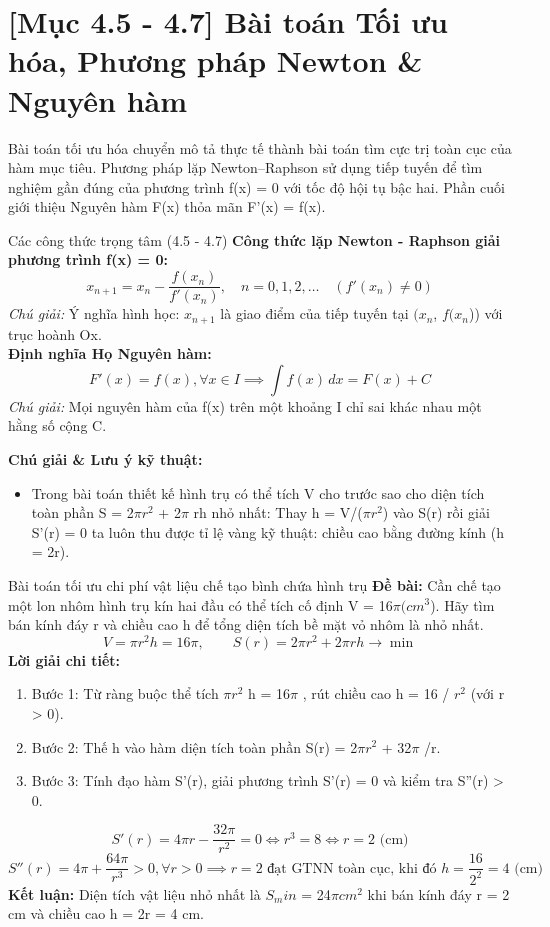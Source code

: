 \documentclass[11pt,a4paper,oneside]{book}
\begin{document}
\section{[Mục 4.5 - 4.7] Bài toán Tối ưu hóa, Phương pháp Newton \& Nguyên hàm}
Bài toán tối ưu hóa chuyển mô tả thực tế thành bài toán tìm cực trị toàn cục của hàm mục tiêu. Phương pháp lặp Newton–Raphson sử dụng tiếp tuyến để tìm nghiệm gần đúng của phương trình f(x) = 0 với tốc độ hội tụ bậc hai. Phần cuối giới thiệu Nguyên hàm F(x) thỏa mãn F'(x) = f(x).

\begin{congthuc}{Các công thức trọng tâm (4.5 - 4.7)}
\noindent\textbf{Công thức lặp Newton - Raphson giải phương trình f(x) = 0:}
\[ x_{n+1} = x_n - \frac{f(x_n)}{f'(x_n)}, \quad n = 0, 1, 2, \dots \quad (f'(x_n) \neq 0) \]
\noindent\textit{Chú giải:} Ý nghĩa hình học: $x_{n+1}$ là giao điểm của tiếp tuyến tại $(x_n$, $f(x_n$)) với trục hoành Ox.\\[4pt]
\noindent\textbf{Định nghĩa Họ Nguyên hàm:}
\[ F'(x) = f(x), \forall x \in I \implies \int f(x)\,dx = F(x) + C \]
\noindent\textit{Chú giải:} Mọi nguyên hàm của f(x) trên một khoảng I chỉ sai khác nhau một hằng số cộng C.\\[4pt]
\end{congthuc}

\noindent\textbf{Chú giải \& Lưu ý kỹ thuật:}
\begin{itemize}[leftmargin=1.5em, itemsep=2pt]
  \item Trong bài toán thiết kế hình trụ có thể tích V cho trước sao cho diện tích toàn phần S = 2$\pi r^2$ + 2$\pi$ rh nhỏ nhất: Thay h = V/($\pi r^2$) vào S(r) rồi giải S'(r) = 0 ta luôn thu được tỉ lệ vàng kỹ thuật: chiều cao bằng đường kính (h = 2r).
\end{itemize}

\begin{vidu}{Bài toán tối ưu chi phí vật liệu chế tạo bình chứa hình trụ}
\textbf{Đề bài:} Cần chế tạo một lon nhôm hình trụ kín hai đầu có thể tích cố định V = 16$\pi (cm^3$). Hãy tìm bán kính đáy r và chiều cao h để tổng diện tích bề mặt vỏ nhôm là nhỏ nhất.
\[ V = \pi r^2 h = 16\pi, \qquad S(r) = 2\pi r^2 + 2\pi r h \to \min \]
\textbf{Lời giải chi tiết:}
\begin{enumerate}[leftmargin=1.5em, itemsep=2pt]
  \item Bước 1: Từ ràng buộc thể tích $\pi r^2$ h = 16$\pi$ , rút chiều cao h = 16 / $r^2$ (với r > 0).
  \item Bước 2: Thế h vào hàm diện tích toàn phần S(r) = 2$\pi r^2$ + 32$\pi$ /r.
  \item Bước 3: Tính đạo hàm S'(r), giải phương trình S'(r) = 0 và kiểm tra S''(r) > 0.
\end{enumerate}
\[ S'(r) = 4\pi r - \frac{32\pi}{r^2} = 0 \iff r^3 = 8 \iff r = 2 \text{ (cm)} \]
\[ S''(r) = 4\pi + \frac{64\pi}{r^3} > 0, \forall r > 0 \implies r = 2 \text{ đạt GTNN toàn cục, khi đó } h = \frac{16}{2^2} = 4 \text{ (cm)} \]
\noindent\textbf{Kết luận:} Diện tích vật liệu nhỏ nhất là $S_min$ = 24$\pi cm^2$ khi bán kính đáy r = 2 cm và chiều cao h = 2r = 4 cm.
\end{vidu}
\end{document}
